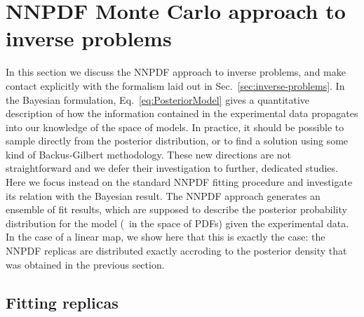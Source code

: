 \section{NNPDF Monte Carlo approach to inverse problems}
\label{sec:closure-test}

In this section we discuss the NNPDF approach to inverse problems, and make
contact explicitly with the formalism laid out in
Sec.~\ref{sec:inverse-problems}. In the Bayesian formulation,
Eq.~\eqref{eq:PosteriorModel} gives a quantitative description of how the
information contained in the experimental data propagates into our knowledge of
the space of models. In practice, it should be possible to sample directly from the posterior 
distribution, or to find a solution using some kind of Backus-Gilbert methodology. These new directions 
are not straightforward and we defer their investigation to further, dedicated 
studies. Here we focus instead on the standard NNPDF fitting procedure and
investigate its relation with the Bayesian result. The NNPDF approach generates 
an ensemble of fit results, which are supposed to describe the posterior probability 
distribution for the model (\ie\ in the space of PDFs) given the experimental data. In the 
case of a linear map, we show here that this is exactly the case: the NNPDF replicas are 
distributed exactly accroding to the posterior density that was obtained in the previous 
section. 


\subsection{Fitting replicas}
\label{sec:fit-reps}


